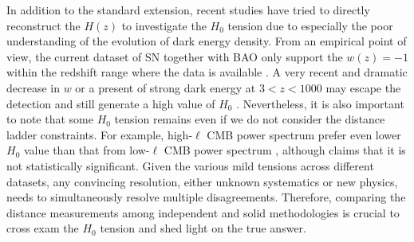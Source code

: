\documentclass[useAMS,usenatbib]{mnras}
\begin{document}

In addition to the standard extension, recent studies \citep[e.g.,][Jee et al. submitted]{BernalEtal16,LemosEtal18,JoudakiEtal18,AylorEtal18} have tried to directly reconstruct the $H(z)$ to investigate the $H_{0}$ tension due to especially the poor understanding of the evolution of dark energy density. From an empirical point of view, the current dataset of SN together with BAO only support the $w(z)=-1$ within 
the redshift range where the data is available \citep{CuestaEtal16}. A very recent and dramatic decrease in $w$ or a present of strong dark energy at $3 <z < 1000$ may escape the detection and still generate a high value of $H_{0}$ \citep{RiessEtal16}.
Nevertheless, it is also important to note that some $H_{0}$ tension remains even if we do not consider the distance ladder constraints. 
For example, high-$\ell$ CMB power spectrum prefer even lower $H_{0}$ value than that from low-$\ell$ CMB power spectrum \citep{AddisonEtal16,planck18parameter}, although \citet{Planck16c} claims that it is not statistically significant. Given the various mild tensions across different datasets, any convincing resolution, either unknown systematics or new physics, needs to simultaneously resolve multiple disagreements. 
Therefore, comparing the distance measurements among independent and solid methodologies is crucial to cross exam the $H_{0}$ tension and shed light on the true answer.
\end{document}
